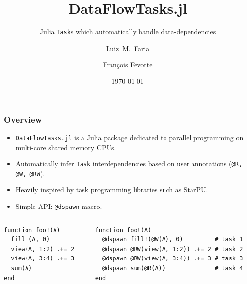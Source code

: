 \documentclass{beamer}
\title[DataFlowTasks] %
{DataFlowTasks.jl}
\subtitle{Julia \texttt{Task}s which automatically handle data-dependencies}
\author[Faria, Fevotte] %
{Luiz~M.~Faria\inst{1} \and François Fevotte\inst{2}}
\institute[]
{
    \inst{1}%
    Chargé de recherche INRIA\\
    POEMS Laboratory
    \and
    \inst{2}%
    FILL ME\\
    FILL ME
}
\date{\today}
\newcommand{\DFT}{\texttt{DataFlowTasks.jl}}
\begin{document}
\frame{\titlepage}

\begin{frame}[fragile]
\frametitle{Overview}

\begin{itemize}
    \item \DFT{} is a Julia package dedicated to parallel programming on multi-core shared memory CPUs.
    \item Automatically infer \texttt{Task} interdependencies based on user annotations (\texttt{@R, @W, @RW}).
    \item Heavily inspired by task programming libraries such as StarPU.
    \item Simple API: \texttt{@dspawn} macro.
\end{itemize}
%
\begin{columns}[t]
\begin{exampleblock}{}
\begin{verbatim}
function foo!(A)
  fill!(A, 0)          
  view(A, 1:2) .+= 2   
  view(A, 3:4) .+= 3   
  sum(A)               
end
\end{verbatim}
\end{exampleblock}
\center {}
 

\begin{exampleblock}{}
\begin{verbatim}
function foo!(A)
  @dspawn fill!(@W(A), 0)         # task 1
  @dspawn @RW(view(A, 1:2)) .+= 2 # task 2
  @dspawn @RW(view(A, 3:4)) .+= 3 # task 3
  @dspawn sum(@R(A))              # task 4
end
\end{verbatim}
\end{exampleblock}
\center {}

\end{columns}


\end{frame}
\end{document}
